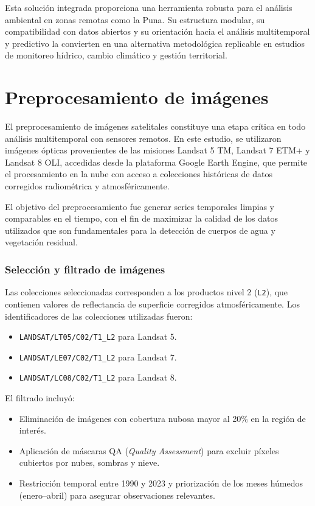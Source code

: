 Esta solución integrada proporciona una herramienta robusta para el análisis ambiental en zonas remotas como la Puna. Su estructura modular, su compatibilidad con datos abiertos y su orientación hacia el análisis multitemporal y predictivo la convierten en una alternativa metodológica replicable en estudios de monitoreo hídrico, cambio climático y gestión territorial.


\section{Preprocesamiento de imágenes}

El preprocesamiento de imágenes satelitales constituye una etapa crítica en todo análisis multitemporal con sensores remotos. En este estudio, se utilizaron imágenes ópticas provenientes de las misiones Landsat 5 TM, Landsat 7 ETM+ y Landsat 8 OLI, accedidas desde la plataforma Google Earth Engine, que permite el procesamiento en la nube con acceso a colecciones históricas de datos corregidos radiométrica y atmosféricamente.

El objetivo del preprocesamiento fue generar series temporales limpias y comparables en el tiempo, con el fin de maximizar la calidad de los datos utilizados que son fundamentales para la detección de cuerpos de agua y vegetación residual. 

\subsubsection*{Selección y filtrado de imágenes}

Las colecciones seleccionadas corresponden a los productos nivel 2 (\texttt{L2}), que contienen valores de reflectancia de superficie corregidos atmosféricamente. Los identificadores de las colecciones utilizadas fueron:

\begin{itemize}
    \item \texttt{LANDSAT/LT05/C02/T1\_L2} para Landsat 5.
    \item \texttt{LANDSAT/LE07/C02/T1\_L2} para Landsat 7.
    \item \texttt{LANDSAT/LC08/C02/T1\_L2} para Landsat 8.
\end{itemize}

El filtrado incluyó:
\begin{itemize}
    \item Eliminación de imágenes con cobertura nubosa mayor al 20\% en la región de interés.
    \item Aplicación de máscaras QA (\textit{Quality Assessment}) para excluir píxeles cubiertos por nubes, sombras y nieve.
    \item Restricción temporal entre 1990 y 2023 y priorización de los meses húmedos (enero–abril) para asegurar observaciones relevantes.
\end{itemize}

